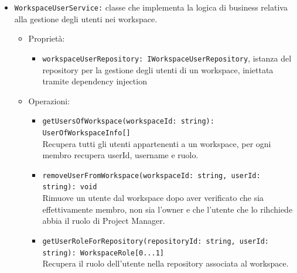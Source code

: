 \documentclass[a4paper, 11pt]{article}
\begin{document}
\begin{itemize}
\begin{itemize}
\begin{itemize}
          \item Operazioni:
          \begin{itemize}
              \item \texttt{getUsersOfWorkspace(workspaceId: string): GetUsersOfWorkspaceResponseDto[]} \\
              Restituisce la lista degli utenti appartenenti al workspace specificato.
              
              \item \texttt{removeUserFromWorkspace(workspaceId: string, userId: string): void} \\
              Gestisce la richiesta di rimozione di un utente da un workspace, delegando la logica al service.
          \end{itemize}
        \end{itemize}
        
        
        \item \texttt{WorkspaceUserService:} classe che implementa la logica di business relativa alla gestione degli utenti nei workspace.
        \begin{itemize}
          \item Proprietà:
          \begin{itemize}
            \item \texttt{workspaceUserRepository: IWorkspaceUserRepository}, istanza del repository per la gestione degli utenti di un workspace, iniettata tramite dependency injection

          \end{itemize}
          \item Operazioni:
        
          \begin{itemize}
              \item \texttt{getUsersOfWorkspace(workspaceId: string): UserOfWorkspaceInfo[]} \\
              Recupera tutti gli utenti appartenenti a un workspace, per ogni membro recupera userId, username e ruolo. 
              
              \item \texttt{removeUserFromWorkspace(workspaceId: string, userId: string): void} \\
              Rimuove un utente dal workspace dopo aver verificato che sia effettivamente membro, non sia l'owner e che l'utente che lo rihchiede abbia il ruolo di Project Manager.
              
              \item \texttt{getUserRoleForRepository(repositoryId: string, userId: string): WorkspaceRole[0...1]} \\
              Recupera il ruolo dell'utente nella repository associata al workspace.
              

\end{itemize}
\end{itemize}
\end{itemize}
\end{itemize}
\end{document}
